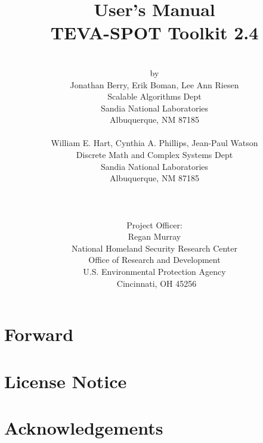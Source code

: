 \documentclass[pdf,report]{EPAmanual}
\title{\sc User's Manual\\TEVA-SPOT Toolkit 2.4}
\author{\\by\\
Jonathan Berry, Erik Boman, Lee Ann Riesen\\
Scalable Algorithms Dept\\
Sandia National Laboratories\\
Albuquerque, NM 87185\\
\mbox{}\\
William E. Hart, Cynthia A. Phillips, Jean-Paul Watson\\
Discrete Math and Complex Systems Dept\\
Sandia National Laboratories\\
Albuquerque, NM 87185\\
    \\\\\\
    Project Officer:\\
    \sc Regan Murray\\
    \sc National Homeland Security Research Center\\
    \sc Office of Research and Development\\
    \sc U.S. Environmental Protection Agency\\\
    \sc Cincinnati, OH 45256
  }
\date{}
\begin{document}
  \maketitle

  \clearpage
  
  
  \clearpage
  \chapter*{Forward}
  

  \clearpage
  \chapter*{License Notice}
  

  \clearpage
  \chapter*{Acknowledgements}
  

  \cleardoublepage
  \tableofcontents

  \SANDmain



\newpage




\newpage



%

  
\end{document}

